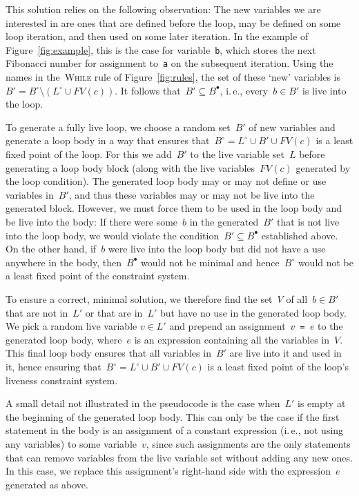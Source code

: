 \documentclass{llncs}
\newcommand{\liveout}[1]{\ensuremath{#1^{\circ}}}
\newcommand{\livein}[1]{\ensuremath{#1^{\bullet}}}
\def\union{\cup}
\begin{document}
This solution relies on the following observation: The new variables we are
interested in are ones that are defined before the loop, may be defined on
some loop iteration, and then used on some later iteration. In the example
of Figure~\ref{fig:example}, this is the case for variable~\verb|b|, which
stores the next Fibonacci number for assignment to~\verb|a| on the
subsequent iteration. Using the names in the~\textsc{While} rule of
Figure~\ref{fig:rules}, the set of these `new' variables is~\(B' =
\liveout{B} \setminus (\liveout{L} \union FV(c))\). It follows that~\(B'
\subseteq \livein{B}\), i.\,e., every~\(b \in B'\) is live into the loop.

To generate a fully live loop, we choose a random set~\(B'\) of new
variables and generate a loop body in a way that ensures that~\(\liveout{B}
= \liveout{L} \union B' \union FV(c)\) is a least fixed point of the loop.
For this we add~\(B'\) to the live variable set~\(L\)
before generating a loop body block (along with the live variables~\(FV(c)\)
generated by the loop condition). The generated loop body may or may not
define or use variables in~\(B'\), and thus these variables may or may not
be live into the generated block. However, we must force them to be used in
the loop body and be live into the body: If there were some~\(b\) in the
generated~\(B'\) that is not live into the loop body, we would violate the
condition~\(B' \subseteq \livein{B}\) established above. On the other hand,
if~\(b\) were live into the loop body but did not have a use anywhere in the
body, then~\(\livein{B}\) would not be minimal and hence~\(\liveout{B}\)
would not be a least fixed point of the constraint system.

To ensure a correct, minimal solution, we therefore find the set~\(V\) of
all~\(b \in B'\) that are not
in~\(L'\) or that are in~\(L'\) but have no use in the generated loop body.
We pick a random live variable \(v \in L'\) and prepend an
assignment~\(v\)\verb| = |\(e\) to the generated loop body, where~\(e\) is
an expression containing all the variables in~\(V\). This final loop body
ensures that all variables in~\(B'\) are live into it and used in it, hence
ensuring that~\(\liveout{B} = \liveout{L} \union B' \union FV(c)\) is a
least fixed point of the loop's liveness constraint system.

A small detail not illustrated in the pseudocode is the case when~\(L'\) is
empty at the beginning of the generated loop body. This can only be the case
if the first statement in the body is an assignment of a constant expression
(i.\,e., not using any variables) to some variable~\(v\), since such
assignments are the only statements that can remove variables from the live
variable set without adding any new ones. In this case, we replace this
assignment's right-hand side with the expression~\(e\) generated as above.
\end{document}
